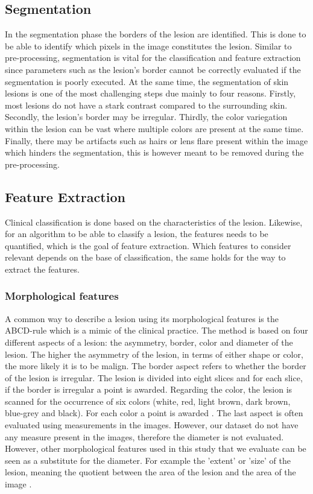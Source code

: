 \documentclass{kththesis}
\begin{document}
\subsection{Segmentation}

In the segmentation phase the borders of the lesion are identified. This is done to be able to identify which pixels in the image constitutes the lesion. Similar to pre-processing, segmentation is vital for the classification and feature extraction since parameters such as the lesion’s border cannot be correctly evaluated if the segmentation is poorly executed. At the same time, the segmentation of skin lesions is one of the most challenging steps due mainly to four reasons. Firstly, most lesions do not have a stark contrast compared to the surrounding skin. Secondly, the lesion’s border may be irregular. Thirdly, the color variegation %
within the lesion can be vast where multiple colors are present at the same time. Finally, there may be artifacts such as hairs or lens flare present within the image which hinders the segmentation, this is however meant to be removed during the pre-processing. \parencite{jaworek2016automatic}

\subsection{Feature Extraction}

Clinical classification is done based on the characteristics of the lesion. Likewise, for an algorithm to be able to classify a lesion, the features needs to be quantified, which is the goal of feature extraction. Which features to consider relevant depends on the base of classification, the same holds for the way to extract the features.

\subsubsection{Morphological features}

A common way to describe a lesion using its morphological features is the ABCD-rule which is a mimic of the clinical practice. The method is based on four different aspects of a lesion: the asymmetry, border, color and diameter of the lesion.
The higher the asymmetry of the lesion, in terms of either shape or color, the more likely it is to be malign. The border aspect refers to whether the border of the lesion is irregular. The lesion is divided into eight slices and for each slice, if the border is irregular a point is awarded.
Regarding the color, the lesion is scanned for the occurrence of six colors (white, red, light brown, dark brown, blue-grey and black). For each color a point is awarded \parencite{https://doi.org/10.1049/iet-ipr.2015.0385}.
The last aspect is often evaluated using measurements in the images. However, our dataset do not have any measure present in the images, therefore the diameter is not evaluated. However, other morphological features used in this study that we evaluate can be seen as a substitute for the diameter. For example the 'extent' or 'size' of the lesion, meaning the quotient between the area of the lesion and the area of the image \parencite{sanchez-reyes2020highaccuracy}.
\parencite{smaoui2013developed}
\end{document}
